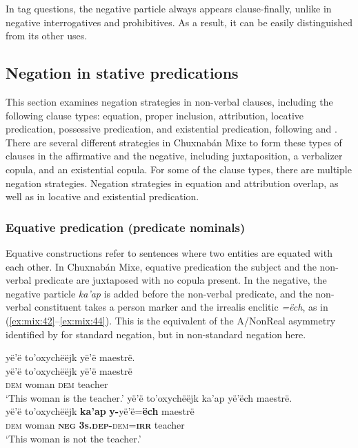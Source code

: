 \documentclass[output=paper,colorlinks,citecolor=brown,draft]{langscibook}
\begin{document}
In tag questions, the negative particle always appears clause-finally, unlike in negative interrogatives and prohibitives. As a result, it can be easily distinguished from its other uses.

\subsection{Negation in stative predications}\label{sec:mix:2.3} 

This section examines negation strategies in non-verbal clauses, including the following clause types: equation, proper inclusion, attribution, locative predication, possessive predication, and existential predication, following \citet[111--128]{Payne1997} and \citet{Veselinova2014}. There are several different strategies in Chux\-nabán  Mixe to form these types of clauses in the affirmative and the negative, including juxtaposition, a verbalizer copula, and an existential copula. For some of the clause types, there are multiple negation strategies. Negation strategies in equation and attribution overlap, as well as in locative and existential predication.

\subsubsection{Equative predication (predicate nominals)}\label{sec:mix:2.3.1}

Equative constructions refer to sentences where two entities are equated with each other. In Chuxnabán Mixe, equative predication the subject and the non-verbal predicate are juxtaposed with no copula present. In the negative, the negative particle \textit{ka’ap} is added before the non\nobreakdash-verbal predicate, and the non-verbal constituent takes a person marker and the irrealis enclitic \textit{=ëch}, as in (\ref{ex:mix:42}--\ref{ex:mix:44}). This is the equivalent of the A/NonReal asymmetry identified by \citet[296--297]{Miestamo2013-wals113} for standard negation, but in non-standard negation here. 

\ea\label{ex:mix:42}
    \ea\label{ex:mix:42a}
        \glll yë’ë to’oxychëëjk yë’ë maestrë.\\ 
              yë’ë to’oxychëëjk yë’ë maestrë\\
              \textsc{dem} woman \textsc{dem} teacher\\
        \glt ‘This woman is the teacher.’
    \ex\label{ex:mix:42b}
        \glll  yë’ë to’oxychëëjk ka’ap yë’ëch maestrë. \\
             yë’ë to’oxychëëjk \textbf{ka’ap} \textbf{y-}yë’ë=\textbf{ëch} maestrë\\
             \textsc{dem} woman \textbf{\textsc{neg}} \textsc{\textbf{3s.dep-}dem=\textbf{irr}} teacher\\
        \glt ‘This woman is not the teacher.’
    \z
\z 
 
\end{document}
